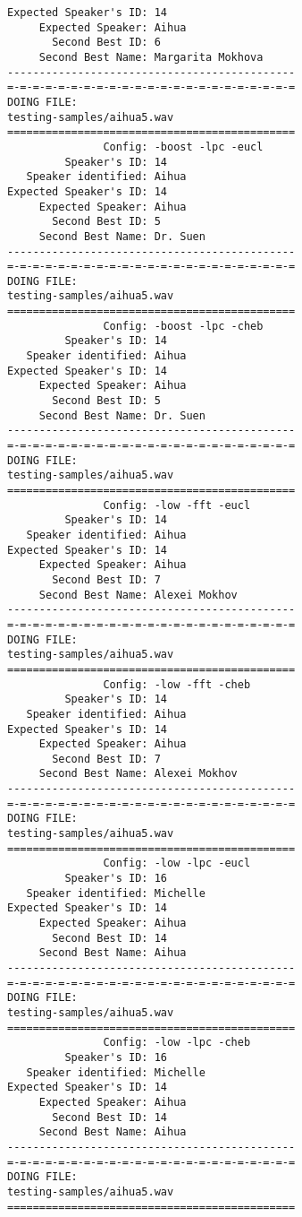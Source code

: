 \begin{verbatim}
Expected Speaker's ID: 14
     Expected Speaker: Aihua
       Second Best ID: 6
     Second Best Name: Margarita Mokhova
---------------------------------------------
=-=-=-=-=-=-=-=-=-=-=-=-=-=-=-=-=-=-=-=-=-=-=
DOING FILE:
testing-samples/aihua5.wav
=============================================
               Config: -boost -lpc -eucl
         Speaker's ID: 14
   Speaker identified: Aihua
Expected Speaker's ID: 14
     Expected Speaker: Aihua
       Second Best ID: 5
     Second Best Name: Dr. Suen
---------------------------------------------
=-=-=-=-=-=-=-=-=-=-=-=-=-=-=-=-=-=-=-=-=-=-=
DOING FILE:
testing-samples/aihua5.wav
=============================================
               Config: -boost -lpc -cheb
         Speaker's ID: 14
   Speaker identified: Aihua
Expected Speaker's ID: 14
     Expected Speaker: Aihua
       Second Best ID: 5
     Second Best Name: Dr. Suen
---------------------------------------------
=-=-=-=-=-=-=-=-=-=-=-=-=-=-=-=-=-=-=-=-=-=-=
DOING FILE:
testing-samples/aihua5.wav
=============================================
               Config: -low -fft -eucl
         Speaker's ID: 14
   Speaker identified: Aihua
Expected Speaker's ID: 14
     Expected Speaker: Aihua
       Second Best ID: 7
     Second Best Name: Alexei Mokhov
---------------------------------------------
=-=-=-=-=-=-=-=-=-=-=-=-=-=-=-=-=-=-=-=-=-=-=
DOING FILE:
testing-samples/aihua5.wav
=============================================
               Config: -low -fft -cheb
         Speaker's ID: 14
   Speaker identified: Aihua
Expected Speaker's ID: 14
     Expected Speaker: Aihua
       Second Best ID: 7
     Second Best Name: Alexei Mokhov
---------------------------------------------
=-=-=-=-=-=-=-=-=-=-=-=-=-=-=-=-=-=-=-=-=-=-=
DOING FILE:
testing-samples/aihua5.wav
=============================================
               Config: -low -lpc -eucl
         Speaker's ID: 16
   Speaker identified: Michelle
Expected Speaker's ID: 14
     Expected Speaker: Aihua
       Second Best ID: 14
     Second Best Name: Aihua
---------------------------------------------
=-=-=-=-=-=-=-=-=-=-=-=-=-=-=-=-=-=-=-=-=-=-=
DOING FILE:
testing-samples/aihua5.wav
=============================================
               Config: -low -lpc -cheb
         Speaker's ID: 16
   Speaker identified: Michelle
Expected Speaker's ID: 14
     Expected Speaker: Aihua
       Second Best ID: 14
     Second Best Name: Aihua
---------------------------------------------
=-=-=-=-=-=-=-=-=-=-=-=-=-=-=-=-=-=-=-=-=-=-=
DOING FILE:
testing-samples/aihua5.wav
=============================================

\end{verbatim}

